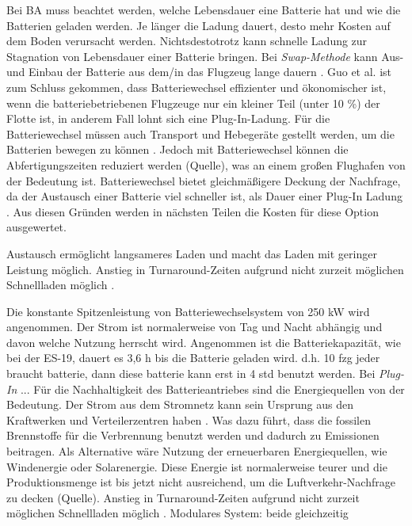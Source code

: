Bei BA muss beachtet werden, welche Lebensdauer eine Batterie hat und wie die Batterien geladen werden. 
Je länger die Ladung dauert, desto mehr Kosten auf dem Boden verursacht werden. Nichtsdestotrotz kann schnelle Ladung 
zur Stagnation von Lebensdauer einer Batterie bringen.
Bei \textit{Swap-Methode} kann Aus- und Einbau der Batterie aus dem/in das Flugzeug lange dauern \cite{dalmia2022powering}. 
Guo et al. \cite{guo2020aviation} ist zum Schluss gekommen, dass Batteriewechsel effizienter und ökonomischer ist, 
wenn die batteriebetriebenen Flugzeuge nur ein kleiner Teil (unter 10 \%) der Flotte ist, in anderem Fall lohnt sich eine Plug-In-Ladung. 
Für die Batteriewechsel müssen auch Transport und Hebegeräte gestellt werden, um die Batterien bewegen zu können \cite{reimers2018introduction}.
Jedoch mit Batteriewechsel können die Abfertigungszeiten reduziert werden (Quelle), was an einem großen Flughafen von der Bedeutung ist. 
Batteriewechsel bietet gleichmäßigere Deckung der Nachfrage, 
da der Austausch einer Batterie viel schneller ist, als Dauer einer Plug-In Ladung \cite{guo2020aviation}.
Aus diesen Gründen werden in nächsten Teilen die Kosten für diese Option ausgewertet.

Austausch ermöglicht langsameres Laden und macht das Laden mit geringer Leistung möglich.
Anstieg in Turnaround-Zeiten aufgrund nicht zurzeit möglichen Schnellladen möglich \cite{avogadro2024demystifying}.

Die konstante Spitzenleistung von Batteriewechselsystem von 250 kW wird angenommen. Der Strom ist normalerweise von Tag und Nacht abhängig
und davon welche Nutzung herrscht wird. Angenommen ist die Batteriekapazität, wie bei der ES-19, dauert es 3,6 h bis die Batterie geladen wird.
d.h. 10 fzg jeder braucht batterie, dann diese batterie kann erst in 4 std benutzt werden.
%
Bei \textit{Plug-In} ...
%
Für die Nachhaltigkeit des Batterieantriebes sind die Energiequellen von der Bedeutung. 
Der Strom aus dem Stromnetz kann sein Ursprung aus den Kraftwerken und Verteilerzentren haben \cite{dalmia2022powering}. 
Was dazu führt, dass die fossilen Brennstoffe für die Verbrennung benutzt werden und dadurch zu Emissionen beitragen. 
Als Alternative wäre Nutzung der erneuerbaren Energiequellen, wie Windenergie oder Solarenergie. Diese Energie ist normalerweise teurer
und die Produktionsmenge ist bis jetzt nicht ausreichend, um die Luftverkehr-Nachfrage zu decken (Quelle).
Anstieg in Turnaround-Zeiten aufgrund nicht zurzeit möglichen Schnellladen möglich \cite{avogadro2024demystifying}.
Modulares System: beide gleichzeitig

